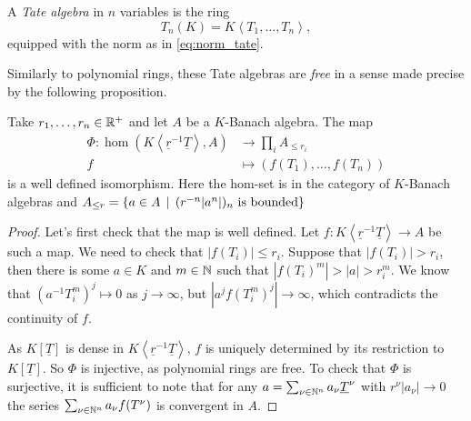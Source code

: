 \begin{definition}
	A \emph{Tate algebra} in $n$ variables is the ring \[
		T_n(K) = K\left<T_1, \ldots, T_n \right>
	,\]
	equipped with the norm as in \eqref{eq:norm_tate}.
\end{definition}

Similarly to polynomial rings, these Tate algebras are \emph{free} in a sense made precise by the following proposition. 
\begin{proposition}\label{prop:universal_property_tate_algebars}
	Take $r_1, \ldots, r_n \in \mathbb{R}^{ +}$ and let $A$ be a $K$-Banach algebra. 
	The map
	\begin{align*}
		\Phi: \hom(K\left<\underline r^{-1} \underline T \right>, A) &\longrightarrow \prod_i A_{\le r_i}  \\
		f &\longmapsto (f(T_1), \ldots, f(T_n))
	\end{align*}
	is a well defined isomorphism. 
	Here the hom-set is in the category of $K$-Banach algebras and $A_{\le r} = \{a \in A \st (r^{-n}|a^{n}|)_n \text{ is bounded}\} $
\end{proposition}
\begin{proof}
	Let's first check that the map is well defined. 
	Let $f: K\left<\underline r^{-1} \underline T \right> \to A$ be such a map. 
	We need to check that $|f(T_i)| \le r_i$. 
	Suppose that  $|f(T_i)| > r_i$, then there is some $a \in K$  and $m \in \mathbb{N}$ such that $|f(T_i)^{m}| > |a| > r_i^{m}$. 
	We know that $(a^{-1}T_i^{m})^{j} \mapsto 0$ as $j \to \infty$, but $|a^{j} f(T_i^{m})^{j}| \to \infty $, which contradicts the continuity of $f$. 


	As $K[\underline T]$ is dense in $K\left<\underline r^{-1} \underline T \right>$, $f$ is uniquely determined by its restriction to $K[\underline T]$. So $\Phi$ is injective, as polynomial rings are free.
	To check that $\Phi$ is surjective, it is sufficient to note that for any $a = \sum_{\nu \in \mathbb{N}^{n}}^{} a_\nu \underline T^{\nu}$ with $r^{\nu} |a_\nu| \to 0$ the series $\sum_{\nu \in \mathbb{N}^{n}} a_\nu f(T^{\nu})$ is convergent in $A$. 
\end{proof}


